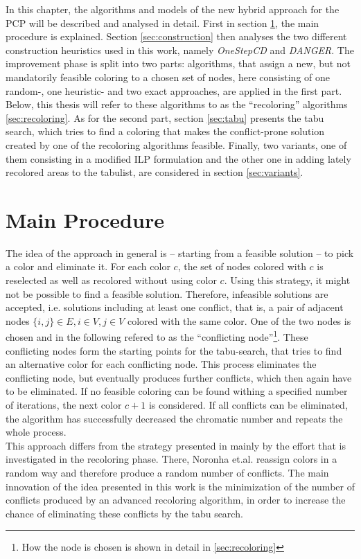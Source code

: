 In this chapter, the algorithms and models of the new hybrid approach for the PCP will be described and analysed in detail. First in section \ref{sec:mainalg}, the main procedure is explained. Section \ref{sec:construction} then analyses the two different construction heuristics used in this work, namely \textit{OneStepCD} and \textit{DANGER}. The improvement phase is split into two parts: algorithms, that assign a new, but not mandatorily feasible coloring to a chosen set of nodes, here consisting of one random-, one heuristic- and two exact approaches, are applied in the first part. Below, this thesis will refer to these algorithms to as the ``recoloring'' algorithms \ref{sec:recoloring}. As for the second part, section \ref{sec:tabu} presents the tabu search, which tries to find a coloring that makes the conflict-prone solution created by one of the recoloring algorithms feasible. Finally, two variants, one of them consisting in a modified ILP formulation and the other one in adding lately recolored areas to the tabulist, are considered in section \ref{sec:variants}.

\section{Main Procedure}
\label{sec:mainalg}

The idea of the approach in general is -- starting from a feasible solution -- to pick a color and eliminate it. For each color $c$, the set of nodes colored with $c$ is reselected as well as recolored without using color $c$. Using this strategy, it might not be possible to find a feasible solution. Therefore, infeasible solutions are accepted, i.e. solutions including at least one conflict, that is, a pair of adjacent nodes $\{i,j\}\in E, i \in V, j\in V$ colored with the same color. One of the two nodes is chosen and in the following refered to as the ``conflicting node''\footnote{How the node is chosen is shown in detail in \ref{sec:recoloring}}. These conflicting nodes form the starting points for the tabu-search, that tries to find an alternative color for each conflicting node. This process eliminates the conflicting node, but eventually produces further conflicts, which then again have to be eliminated. If no feasible coloring can be found withing a specified number of iterations, the next color $c+1$ is considered. If all conflicts can be eliminated, the algorithm has successfully decreased the chromatic number and repeats the whole process.\\
This approach differs from the strategy presented in \cite{noronha-06} mainly by the effort that is investigated in the recoloring phase. There, Noronha et.al. reassign colors in a random way and therefore produce a random number of conflicts. The main innovation of the idea presented in this work is the minimization of the number of conflicts produced by an advanced recoloring algorithm, in order to increase the chance of eliminating these conflicts by the tabu search.\\

